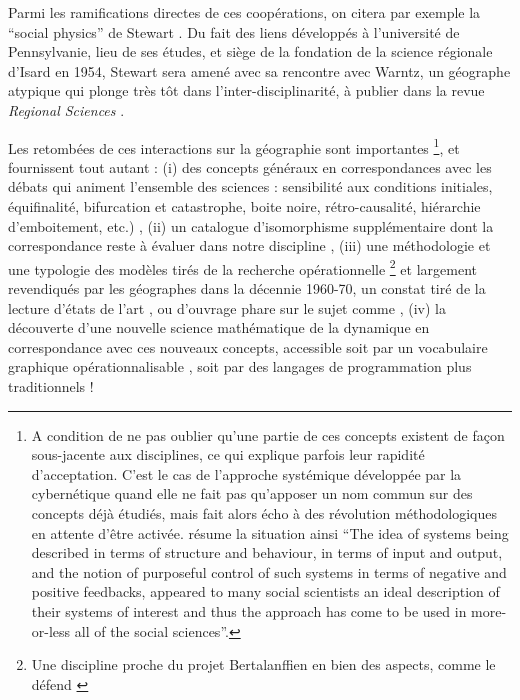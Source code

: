 Parmi les ramifications directes de ces coopérations, on citera par exemple la \enquote{social physics} de Stewart \autocite{Stewart1947}. Du fait des liens développés à l'université de Pennsylvanie, lieu de ses études, et siège de la fondation de la science régionale d'Isard en 1954, Stewart sera amené avec sa rencontre avec Warntz, un géographe atypique qui plonge très tôt dans l'inter-disciplinarité, à publier dans la revue \textit{Regional Sciences} \autocite{Stewart1958}.

Les retombées de ces interactions sur la géographie sont importantes \footnote{ A condition de ne pas oublier qu'une partie de ces concepts existent de façon sous-jacente aux disciplines, ce qui explique parfois leur rapidité d'acceptation. C'est le cas de l'approche systémique développée par la cybernétique quand elle ne fait pas qu'apposer un nom commun sur des concepts déjà étudiés, mais fait alors écho à des révolution méthodologiques en attente d'être activée. \textcite[5]{Batty1976} résume la situation ainsi \foreignquote{english}{The idea of systems being described in terms of structure and behaviour, in terms of input and output, and the notion of purposeful control of such systems in terms of negative and positive feedbacks, appeared to many social scientists an ideal description of their systems of interest and thus the approach has come to be used in more-or-less all of the social sciences}.}, et fournissent tout autant : (i) des concepts généraux en correspondances avec les débats qui animent l'ensemble des sciences : sensibilité aux conditions initiales, équifinalité, bifurcation et catastrophe, boite noire, rétro-causalité, hiérarchie d'emboitement, etc.) , (ii) un catalogue d'isomorphisme supplémentaire dont la correspondance reste à évaluer dans notre discipline \autocite{Wilson1969}, (iii)  une méthodologie et une typologie des modèles tirés de la recherche opérationnelle \autocite{Ackoff1962} \footnote{Une discipline proche du projet Bertalanffien en bien des aspects, comme le défend \autocite[801]{Pouvreau2013}} et largement revendiqués par les géographes dans la décennie 1960-70, un constat tiré de la lecture d'états de l'art \autocite{Kohn1970}, ou d'ouvrage phare sur le sujet comme \autocite{Berry1964a, Haggett1965}, (iv) la découverte d'une nouvelle science mathématique de la dynamique en correspondance avec ces nouveaux concepts, accessible soit par un vocabulaire graphique opérationnalisable \autocite{Forrester1961}, soit par des langages de programmation plus traditionnels !

